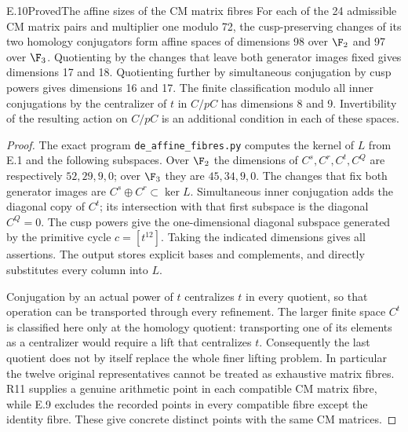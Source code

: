 \begin{statement}{E.10}{Proved}{The affine sizes of the CM matrix fibres}
For each of the 24 admissible CM matrix pairs and multiplier one
modulo 72, the cusp-preserving changes of its two homology
conjugators form affine spaces of dimensions 98 over $\F_2$ and
97 over $\F_3$. Quotienting by the changes that leave both generator
images fixed gives dimensions 17 and 18. Quotienting further by
simultaneous conjugation by cusp powers gives dimensions 16 and 17.
The finite classification modulo all inner conjugations by the
centralizer of $t$ in $C/pC$ has dimensions 8 and 9.
Invertibility of the resulting action on $C/pC$ is an additional
condition in each of these spaces.
\end{statement}
\begin{proof}
The exact program \texttt{de\_affine\_fibres.py} computes the
kernel of $L$ from E.1 and the following subspaces. Over $\F_2$
the dimensions of $C^s,C^r,C^t,C^Q$ are respectively $52,29,9,0$;
over $\F_3$ they are $45,34,9,0$. The changes that fix both
generator images are $C^s\oplus C^r\subset\ker L$. Simultaneous
inner conjugation adds the diagonal copy of $C^t$; its intersection
with that first subspace is the diagonal $C^Q=0$. The cusp powers
give the one-dimensional diagonal subspace generated by the
primitive cycle $c=[t^{12}]$. Taking the indicated dimensions gives
all assertions. The output stores explicit bases and complements,
and directly substitutes every column into $L$.

Conjugation by an actual power of $t$ centralizes $t$ in every
quotient, so that operation can be transported through every
refinement. The larger finite space $C^t$ is classified here only
at the homology quotient: transporting one of its elements as a
centralizer would require a lift that centralizes $t$. Consequently
the last quotient does not by itself replace the whole finer
lifting problem. In particular the twelve original representatives
cannot be treated as exhaustive matrix fibres. R11 supplies a
genuine arithmetic point in each compatible CM matrix fibre, while
E.9 excludes the recorded points in every compatible fibre except
the identity fibre. These give concrete distinct points with the
same CM matrices.
\end{proof}

